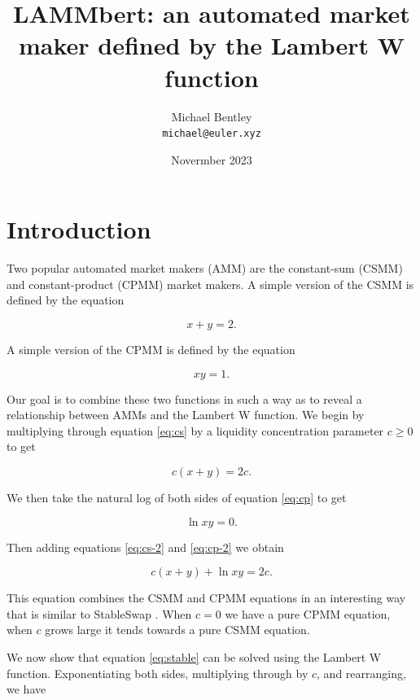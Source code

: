 \documentclass[bibliography=numbered]{article}
\title{LAMMbert: an automated market maker defined by the Lambert W function}
\author{
  Michael Bentley \\
  \texttt{michael@euler.xyz}}
\date{Novermber 2023}
\begin{document}
\maketitle

\section{Introduction}

Two popular automated market makers (AMM) are the constant-sum (CSMM) and constant-product (CPMM) market makers. A simple version of the CSMM is defined by the equation 

\begin{equation}
\label{eq:cs}
    x + y 
    =
    2.
\end{equation}

A simple version of the CPMM is defined by the equation 

\begin{equation}
\label{eq:cp}
    xy 
    = 
    1.
\end{equation}

Our goal is to combine these two functions in such a way as to reveal a relationship between AMMs and the Lambert W function. We begin by multiplying through equation \eqref{eq:cs} by a liquidity concentration parameter $c \geq 0$ to get

\begin{equation}
\label{eq:cs-2}
    c(x + y)
    =
    2c.
\end{equation}

We then take the natural log of both sides of equation \eqref{eq:cp} to get

\begin{equation}
\label{eq:cp-2}
    \ln{xy}
    = 
    0.
\end{equation}

Then adding equations \eqref{eq:cs-2} and \eqref{eq:cp-2} we obtain

\begin{equation}
\label{eq:stable}
    c(x + y) + \ln{xy}
    = 
    2c.
\end{equation}

This equation combines the CSMM and CPMM equations in an interesting way that is similar to StableSwap \cite{egorov2019stableswap}. When $c = 0$ we have a pure CPMM equation, when $c$ grows large it tends towards a pure CSMM equation. 

We now show that equation \eqref{eq:stable} can be solved using the Lambert W function. Exponentiating both sides, multiplying through by $c$, and rearranging, we have
\end{document}
